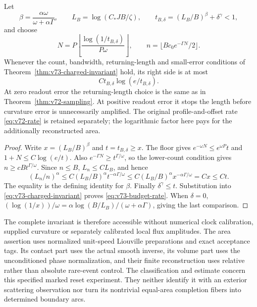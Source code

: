 \begin{corollary}
\label{cor:v73-budget}
Let
\[
 \beta=\frac{\alpha\omega}{\omega+\alpha\Gamma},\qquad
 L_B=\log(C_*JB/\zeta),\qquad
 t_{B,\delta}=(L_B/B)^\beta+\delta^\gamma<1,
\]
and choose
\begin{equation}\label{eq:v73-budget-design}
 N=P\left\lfloor\frac{\log(1/t_{B,\delta})}{P\omega}\right\rfloor,
 \qquad n=\lfloor Bc_0e^{-\Gamma N}/2\rfloor.
\end{equation}
Whenever the count, bandwidth, returning-length and small-error conditions
of Theorem~\ref{thm:v73-charged-invariant} hold, its right side is at most
\begin{equation}\label{eq:v73-budget-rate}
                C t_{B,\delta}\log(e/t_{B,\delta}).
\end{equation}
At zero readout error the returning-length choice is the same as in
Theorem~\ref{thm:v72-sampling}.  At positive readout error it stops the
length before curvature error is unnecessarily amplified.  The original
profile-and-offset rate \eqref{eq:v72-rate} is retained separately;
the logarithmic factor here pays for the additionally reconstructed area.
\end{corollary}
\begin{proof}
Write $x=(L_B/B)^\beta$ and $t=t_{B,\delta}\ge x$.  The floor gives
$e^{-\omega N}\le e^{\omega P}t$ and $1+N\le C\log(e/t)$.
Also $e^{-\Gamma N}\ge t^{\Gamma/\omega}$, so the lower-count
condition gives $n\ge cB t^{\Gamma/\omega}$.  Since $n\le B$,
$L_n\le CL_B$, and hence
\[
 (L_n/n)^\alpha
 \le C(L_B/B)^\alpha t^{-\alpha\Gamma/\omega}
 \le C(L_B/B)^\alpha x^{-\alpha\Gamma/\omega}=Cx\le Ct.
\]
The equality is the defining identity for $\beta$.
Finally $\delta^\gamma\le t$.  Substitution into
\eqref{eq:v73-charged-invariant} proves \eqref{eq:v73-budget-rate}.
When $\delta=0$, $(\log(1/x))/\omega=
\alpha\log(B/L_B)/(\omega+\alpha\Gamma)$, giving the last comparison.
\end{proof}

The complete invariant is therefore accessible without numerical clock
calibration, supplied curvature or separately calibrated local flux
amplitudes.  The area assertion uses normalized unit-speed Liouville
preparations and exact acceptance tags.  Its contact part uses the
actual smooth inverse, its volume part uses the unconditioned phase
normalization, and their finite reconstruction uses relative rather than
absolute rare-event control.  The classification and estimate concern
this specified marked reset experiment.  They neither identify it with
an exterior scattering observation nor turn its nontrivial equal-area
completion fibers into determined boundary arcs.
